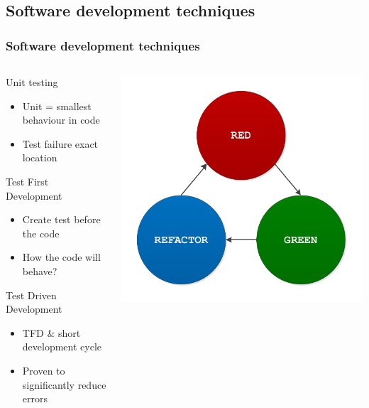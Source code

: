 \documentclass[british,10pt]{beamer}
\begin{document}
\subsection{Software development techniques}
\begin{frame}\frametitle{Software development techniques}
\begin{columns}
\begin{column}{0.6\textwidth}
Unit testing
\begin{itemize}
\item Unit = smallest behaviour in code
\item Test failure  exact location
\end{itemize}
\vskip3pt
Test First Development
\begin{itemize}
\item Create test before the code
\item How the code will behave?
\end{itemize}
\vskip3pt
Test Driven Development
\begin{itemize}
\item TFD \& short development cycle
\item Proven to significantly reduce errors
\end{itemize}
\end{column}
\includegraphics[width=\textwidth]{images/tdd.pdf}
\end{columns}
\end{frame}
\end{document}
